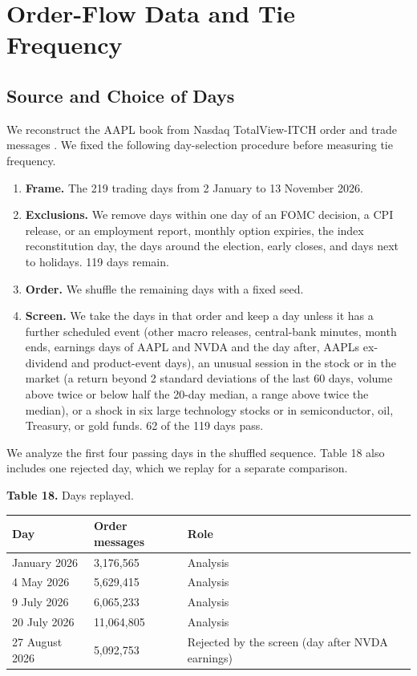 
\section{Order-Flow Data and Tie Frequency}

\subsection{Source and Choice of Days}

We reconstruct the AAPL book from Nasdaq TotalView-ITCH order and trade messages \cite{itch}. We fixed the following day-selection procedure before measuring tie frequency.

\begin{enumerate}
\def\labelenumi{\arabic{enumi}.}
\item
  \textbf{Frame.} The 219 trading days from 2 January to 13 November 2026.
\item
  \textbf{Exclusions.} We remove days within one day of an FOMC decision, a CPI release, or an employment report, monthly option expiries, the index reconstitution day, the days around the election, early closes, and days next to holidays. 119 days remain.
\item
  \textbf{Order.} We shuffle the remaining days with a fixed seed.
\item
  \textbf{Screen.} We take the days in that order and keep a day unless it has a further scheduled event (other macro releases, central-bank minutes, month ends, earnings days of AAPL and NVDA and the day after, AAPL\textquotesingle s ex-dividend and product-event days), an unusual session in the stock or in the market (a return beyond 2 standard deviations of the last 60 days, volume above twice or below half the 20-day median, a range above twice the median), or a shock in six large technology stocks or in semiconductor, oil, Treasury, or gold funds. 62 of the 119 days pass.
\end{enumerate}

We analyze the first four passing days in the shuffled sequence. Table 18 also includes one rejected day, which we replay for a separate comparison.

\textbf{Table 18.} Days replayed.

\begin{longtable}[]{@{}lll@{}}
\toprule\noalign{}
Day & Order messages & Role \\
\midrule\noalign{}
\endhead
\bottomrule\noalign{}
\endlastfoot
23 January 2026 & 3,176,565 & Analysis \\
4 May 2026 & 5,629,415 & Analysis \\
9 July 2026 & 6,065,233 & Analysis \\
20 July 2026 & 11,064,805 & Analysis \\
27 August 2026 & 5,092,753 & Rejected by the screen (day after NVDA earnings) \\
\end{longtable}

